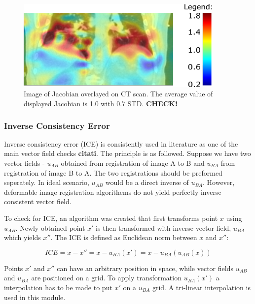 \documentclass[type=dr, dr=rernat, accentcolor=tud7b,colorbacktitle, bigchapter, openright, twoside, 12pt ]{tudthesis}
\begin{document}
\begin{figure}[H]
	\begin{center}		
		\includegraphics[width=0.9\textwidth]{./Images/jacobian.png}
		\caption{Image of Jacobian overlayed on CT scan. The average value of displayed Jacobian is 1.0 with 0.7 STD. \textbf{CHECK!}}
		\label{Jacobian}
	\end{center}
\end{figure}

\subsubsection{Inverse Consistency Error}
\label{ICE}

Inverse consistency error (ICE) is consistently used in literature as one of the main vector field checks \textbf{citati}. The principle is as followed. Suppose we have two vector fields - $u_{AB}$ obtained from registration of image A to B and $u_{BA}$ from registration of image B to A. The two registrations
should be preformed seperately. In ideal scenario, $u_{AB}$ would be a direct inverse of $u_{BA}$. However, deformable image registration algorithems do not yield perfectly inverse consistent vector field.

To check for ICE, an algorithm was created that first transforms point $x$ using $u_{AB}$. Newly obtained point $x'$ is then transformed with inverse vector
field, $u_{BA}$ which yields $x''$. The ICE is defined as Euclidean norm between $x$ and $x''$:

\begin{equation}
ICE = x - x'' = x - u_{BA}(x') = x - u_{BA}(u_{AB}(x))
\end{equation}

Points $x'$ and $x''$ can have an arbitrary position in space, while vector fields $u_{AB}$ and $u_{BA}$ are positioned on a grid. To apply transformation $u_{BA}(x')$ a interpolation has to be made to put $x'$ on a $u_{BA}$ grid. A tri-linear interpolation is used in this module.
\end{document}
